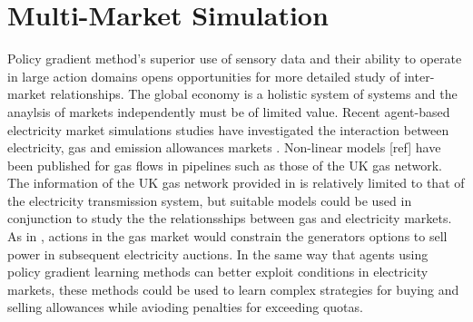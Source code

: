 \section{Multi-Market Simulation}
Policy gradient method's superior use of sensory data and their ability to
operate in large action domains opens opportunities for more detailed study of
inter-market relationships.  The global economy is a holistic system of
systems and the anaylsis of markets independently must be of limited value.
Recent agent-based electricity market simulations studies have investigated the
interaction between electricity, gas and emission allowances markets
\cite{krause:gas,wang:09}.
Non-linear models [ref] have been published for gas flows in pipelines such as
those of the UK gas network.  The information of the UK gas network provided in
 is relatively limited to that of the electricity
transmission system, but suitable models could be used in conjunction
to study the the relationsships between gas and electricity markets. As in
, actions in the gas market would constrain the generators
options to sell power in subsequent electricity auctions.  In the same way
that agents using policy gradient learning methods can better exploit
conditions in electricity markets, these methods could be used to learn
complex strategies for buying and selling allowances while avioding penalties
for exceeding quotas.

%
%

